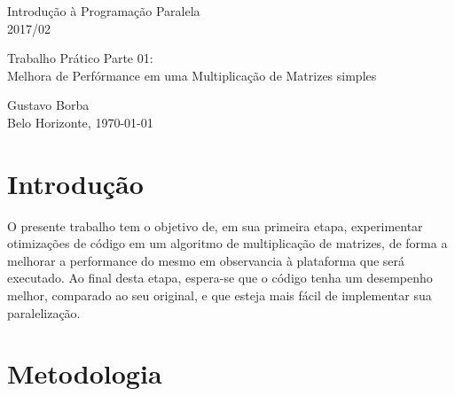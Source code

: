 \documentclass[a4paper,10pt]{article}
\def \materia {Introdução à Programação Paralela}
\def \semestre {2017/02}
\def \city {Belo Horizonte}
\def \numeropratica {Parte 01}
\def \authora {Gustavo Borba}
\def \praticano {Trabalho Prático \numeropratica}
\def \titulopratica {Melhora de Perfórmance em uma Multiplicação de Matrizes simples}
\begin{document}

\thispagestyle{empty}


\begin{center}

    \begin{minipage}[l]{10cm}{
        \begin{center}
            \materia \\ \semestre \\
        \end{center}
    }
    \end{minipage}
     
    \vfill
     
    \begin{minipage}[l]{11cm}{
       \begin{center}
       \Large{ \praticano:  \\ \titulopratica }
       \end{center}
    }
    \end{minipage}

\end{center}


\vspace*{8cm}

\begin{center}
    \begin{minipage}[l]{10cm}{
    \center \authora \\ \city, \today \\
 }
 \end{minipage}
 \end{center}

\newpage

\newpage
\clearpage
\setcounter{page}{1}




\section{Introdução}

O presente trabalho tem o objetivo de, em sua primeira etapa, experimentar otimizações de código em um algoritmo de multiplicação de matrizes, de forma a melhorar a performance do mesmo em observancia à plataforma que será executado. Ao final desta etapa, espera-se que o código tenha um desempenho melhor, comparado ao seu original, e que esteja mais fácil de implementar sua paralelização. 

\section{Metodologia}
\end{document}
